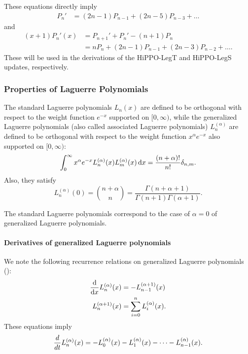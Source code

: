 \documentclass[../hippo.tex]{subfiles}
\begin{document}
These equations directly imply
\begin{align}
  P_{n}' &= (2n-1)P_{n-1} + (2n-5)P_{n-3} + \dots
  \label{eq:legendre-d}
\end{align}
and
\begin{align}
  (x+1)P_n'(x) &= P_{n+1}' + P_n' - (n+1)P_n
  \nonumber \\
  &= nP_n + (2n-1)P_{n-1} + (2n-3)P_{n-2} + \dots
  .
  \label{eq:legendre-xd}
\end{align}
These will be used in the derivations of the HiPPO-LegT and HiPPO-LegS updates, respectively.

\subsubsection{Properties of Laguerre Polynomials}
\label{sec:laguerre-properties}

The standard Laguerre polynomials $L_n(x)$ are defined to be orthogonal with
respect to the weight function $e^{-x}$ supported on $[0, \infty)$, while the
generalized Laguerre polynomials (also called associated Laguerre polynomials)
$L_n^{(\alpha)}$ are defined to be orthogonal with respect to the weight function
$x^{\alpha} e^{-x}$ also supported on $[0, \infty)$:
\begin{equation}
  \label{eq:laguerre}
  \int_{0}^{\infty} x^\alpha e^{-x} L_n^{(\alpha)}(x) L_m^{(\alpha)}(x) \mathop{}\!\mathrm{d} x = \frac{(n+\alpha)!}{n!} \delta_{n, m}.
\end{equation}
Also, they satisfy
\begin{equation}%
  \label{eq:laguerre-endpoint}
  L_n^{(\alpha)}(0) = \binom{n + \alpha}{n} = \frac{\Gamma(n+\alpha+1)}{\Gamma(n+1)\Gamma(\alpha+1)}.
\end{equation}

The standard Laguerre polynomials correspond to the case of $\alpha = 0$ of
generalized Laguerre polynomials.

\paragraph{Derivatives of generalized Laguerre polynomials}

We note the following recurrence relations on generalized Laguerre polynomials (\citep[Chapter~13.2]{arfken2005mathematical}):
\begin{align*}
  \frac{\mathop{}\!\mathrm{d}}{\mathop{}\!\mathrm{d} x} L_n^{(\alpha)}(x) &= -L_{n-1}^{(\alpha+1)} (x) \\
  L_{n}^{(\alpha+1)}(x) &= \sum_{i=0}^{n} L_i^{(\alpha)}(x).
\end{align*}
These equations imply
\begin{equation*}
  \frac{d}{d t} L_n^{(\alpha)}(x) = - L_{0}^{(\alpha)}(x) - L_{1}^{(\alpha)} (x) - \dots - L_{n-1}^{(\alpha)}(x).
\end{equation*}
\end{document}

